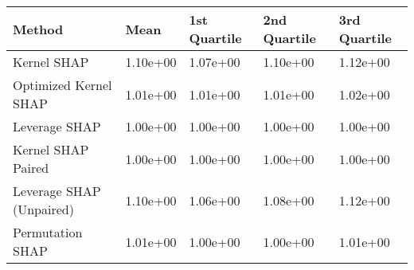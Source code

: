 \begin{tabular}{lllll}
  \toprule
  \textbf{Method} & \textbf{Mean} & \textbf{1st Quartile} & \textbf{2nd Quartile} & \textbf{3rd Quartile} \\ \midrule 
Kernel SHAP & 1.10e+00 & 1.07e+00 & 1.10e+00 & 1.12e+00\\
Optimized Kernel SHAP & \cellcolor{bronze!60}1.01e+00 & 1.01e+00 & 1.01e+00 & 1.02e+00\\
Leverage SHAP & \cellcolor{gold!60}1.00e+00 & \cellcolor{gold!60}1.00e+00 & \cellcolor{gold!60}1.00e+00 & \cellcolor{gold!60}1.00e+00\\
Kernel SHAP Paired & \cellcolor{gold!60}1.00e+00 & \cellcolor{gold!60}1.00e+00 & \cellcolor{gold!60}1.00e+00 & \cellcolor{gold!60}1.00e+00\\
Leverage SHAP (Unpaired) & 1.10e+00 & 1.06e+00 & 1.08e+00 & 1.12e+00\\
Permutation SHAP & \cellcolor{bronze!60}1.01e+00 & \cellcolor{gold!60}1.00e+00 & \cellcolor{gold!60}1.00e+00 & \cellcolor{bronze!60}1.01e+00\\
\bottomrule
\end{tabular}